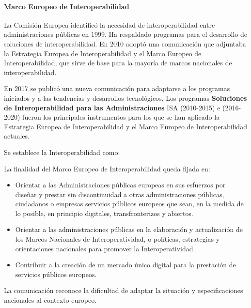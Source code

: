        \paragraph{Marco Europeo de Interoperabilidad} %
            La Comisión Europea identificó la necesidad de interoperabilidad entre administraciones públicas en 1999. Ha respaldado programas para el desarrollo de soluciones de interoperabilidad. En 2010 adoptó una comunicación que adjuntaba la Estrategia Europea de Interoperabilidad y el Marco Europeo de Interoperabilidad, que sirve de base para la mayoría de marcos nacionales de interoperabilidad.

            En 2017 se publicó una nueva comunicación para adaptarse a los programas iniciados y a las tendencias y desarrollos tecnológicos. Los programas \textbf{Soluciones de Interoperabilidad para las Administraciones} ISA (2010-2015) e \ISA (2016-2020) fueron los principales instrumentos para los que se han aplicado la Estrategia Europea de Interoperabilidad y el Marco Europeo de Interoperabilidad actuales.

            Se establece la Interoperabilidad como:

            \noindent{}

            La finalidad del Marco Europeo de Interoperabilidad queda fijada en:
            \begin{itemize}
                \item Orientar a las Administraciones públicas europeas en sus esfuerzos por diseñar y prestar sin discontinuidad a otras administraciones públicas, ciudadanos o empresas servicios públicos europeos que sean, en la medida de lo posible, en principio digitales, transfronterizos y abiertos.
                \item Orientar a las administraciones públicas en la elaboración y actualización de los Marcos Nacionales de Interoperatividad, o políticas, estrategias y orientaciones nacionales para promover la Interoperatividad.
                \item Contribuir a la creación de un mercado único digital para la prestación de servicios públicos europeos.
            \end{itemize}
            La comunicación reconoce la dificultad de adaptar la situación y especificaciones nacionales al contexto europeo.

